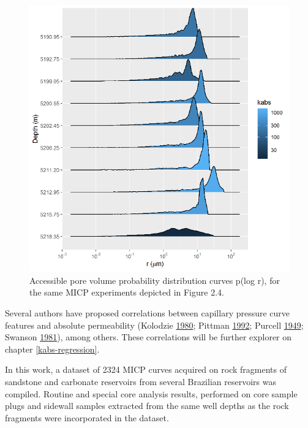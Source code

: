 \documentclass[english,msc,numbers]{coppe}
\begin{document}
  \begin{figure}
  
  {\centering \includegraphics[width=0.9\linewidth]{figure/2-5-pdf-curves} 
  
  }
  
  \caption{Accessible pore volume probability distribution curves p(log r), for the same MICP experiments depicted in Figure 2.4.}\label{fig:pdf-curves}
  \end{figure}
  Several authors have proposed correlations between capillary pressure curve features and absolute permeability (Kolodzie \protect\hyperlink{ref-Kolodzie1980}{1980}; Pittman \protect\hyperlink{ref-Pittman1992}{1992}; Purcell \protect\hyperlink{ref-Purcell1949}{1949}; Swanson \protect\hyperlink{ref-Swanson1981}{1981}), among others. These correlations will be further explorer on chapter \ref{kabs-regression}.
  
  In this work, a dataset of 2324 MICP curves acquired on rock fragments of sandstone and carbonate reservoirs from several Brazilian reservoirs was compiled. Routine and special core analysis results, performed on core sample plugs and sidewall samples extracted from the same well depths as the rock fragments were incorporated in the dataset.
  
\end{document}
